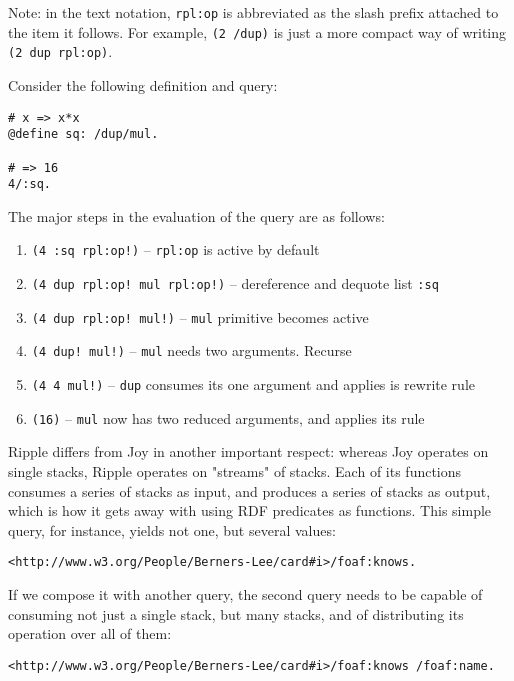 \documentclass[runningheads]{llncs}
\begin{document}
Note: in the text notation, \texttt{rpl:op} is abbreviated as the slash prefix attached to the item it follows.  For example, \texttt{(2 /dup)} is just a more compact way of writing \texttt{(2 dup rpl:op)}.














Consider the following definition and query:

\begin{verbatim}
# x => x*x
@define sq: /dup/mul.

# => 16
4/:sq.
\end{verbatim}
The major steps in the evaluation of the query are as follows:
\begin{enumerate}
\item \texttt{(4 :sq rpl:op!)} -- \texttt{rpl:op} is active by default
\item \texttt{(4 dup rpl:op! mul rpl:op!)} -- dereference and dequote list \texttt{:sq}
\item \texttt{(4 dup rpl:op! mul!)} -- \texttt{mul} primitive becomes active
\item \texttt{(4 dup! mul!)} -- \texttt{mul} needs two arguments.  Recurse
\item \texttt{(4 4 mul!)} -- \texttt{dup} consumes its one argument and applies is rewrite rule
\item \texttt{(16)} -- \texttt{mul} now has two reduced arguments, and applies its rule
\end{enumerate}


Ripple differs from Joy in another important respect: whereas Joy operates on single stacks, Ripple operates on "streams" of stacks.  Each of its functions consumes a series of stacks as input, and produces a series of stacks as output, which is how it gets away with using RDF predicates as functions.  This simple query, for instance, yields not one, but several values:
\begin{verbatim}
<http://www.w3.org/People/Berners-Lee/card#i>/foaf:knows.
\end{verbatim}

If we compose it with another query, the second query needs to be capable of consuming not just a single stack, but many stacks, and of distributing its operation over all of them:
\begin{verbatim}
<http://www.w3.org/People/Berners-Lee/card#i>/foaf:knows /foaf:name.
\end{verbatim}
\end{document}
